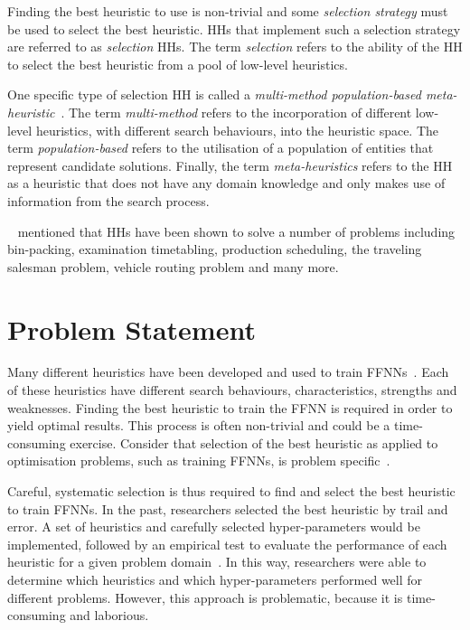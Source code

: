 Finding the best heuristic to use is non-trivial and some \textit{selection strategy} must be used to select the best heuristic. \acp{HH} that implement such a selection strategy are referred to as \textit{selection} \acp{HH}. The term \textit{selection} refers to the ability of the \acs{HH} to select the best heuristic from a pool of low-level heuristics.

One specific type of selection \acs{HH} is called a \textit{multi-method population-based meta-heuristic}~\cite{ref:vanderstockt:2018}. The term \textit{multi-method} refers to the incorporation of different low-level heuristics, with different search behaviours, into the heuristic space. The term \textit{population-based} refers to the utilisation of a population of entities that represent candidate solutions. Finally, the term \textit{meta-heuristics} refers to the \acs{HH} as a heuristic that does not have any domain knowledge and only makes use of information from the search process.

\citeauthor{ref:grobler:2015}~\cite{ref:grobler:2015} mentioned that \acp{HH} have been shown to solve a number of problems including bin-packing, examination timetabling, production scheduling, the traveling salesman problem, vehicle routing problem and many more.

\section{Problem Statement}\label{sec:introduction:problem}

Many different heuristics have been developed and used to train \acp{FFNN}~\cite{ref:gudise:2003, ref:rakitianskaia:2012, ref:montana:1989}. Each of these heuristics have different search behaviours, characteristics, strengths and weaknesses. Finding the best heuristic to train the \acs{FFNN} is required in order to yield optimal results. This process is often non-trivial and could be a time-consuming exercise.  Consider that selection of the best heuristic as applied to optimisation problems, such as training \acp{FFNN}, is problem specific~\cite{ref:allen:1996, ref:drake:2020, ref:pillay:2018}.

Careful, systematic selection is thus required to find and select the best heuristic to train \acp{FFNN}. In the past, researchers selected the best heuristic by trail and error. A set of heuristics and carefully selected hyper-parameters would be implemented, followed by an empirical test to evaluate the performance of each heuristic for a given problem domain~\cite{ref:pillay:2015}. In this way, researchers were able to determine which heuristics and which hyper-parameters performed well for different problems. However, this approach is problematic, because it is time-consuming and laborious.

